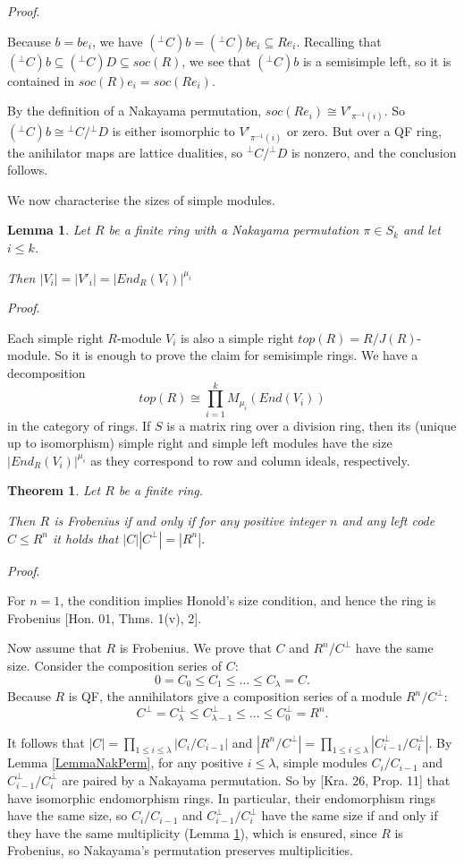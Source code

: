 \documentclass{article}
\theoremstyle{plain}
\newtheorem{Thm}[veta]{Theorem}
\newtheorem{Lemma}[veta]{Lemma}
\theoremstyle{plain}
\theoremstyle{remark}
\theoremstyle{plain}
\newenvironment{dukaz}{
  \par\medskip \noindent
  \textit{Proof}.
}{

\rightline{$\qedsymbol$}
}
\begin{document}
\begin{dukaz}
    Because $b = be_i$, we have $({}^\perp C)b = ({}^\perp C)be_i \subseteq Re_i$.  Recalling that $({}^\perp C)b\subseteq ({}^\perp C)D \subseteq  soc(R)$, we see that $({}^\perp C)b$ is a semisimple left, so it is contained in $soc(R)e_i=soc(Re_i)$. 
    
    
By the definition of a Nakayama permutation, $soc(Re_i)\cong V'_{\pi^{-1}(i)}$. So $({}^\perp C)b\cong {}^\perp C/{}^\perp D$ is either isomorphic to  $V'_{\pi^{-1}(i)}$ or zero. But over a QF ring, the anihilator maps are lattice dualities, so ${}^\perp C/{}^\perp D$ is nonzero, and the conclusion follows.
\end{dukaz}
We now characterise the sizes of simple modules. 
\begin{Lemma}\label{LemmaSize}
    Let $R$ be a finite ring with a Nakayama permutation $\pi\in S_k$ and let $i\leq k$.

    Then $|V_i|=|V'_i|=|End_R(V_i)|^{\mu_i}$
\end{Lemma}
\begin{dukaz}
  Each simple right $R$-module $V_i$ is also a simple right $top(R)=R/J(R)$-module. So it is enough to prove the claim for semisimple rings. We have a decomposition
\[top(R)\cong \prod_{i=1} ^k M_{\mu_i}(End(V_i))\]
in the category of rings. If $S$ is a matrix ring over a division ring, then its (unique up to isomorphism) simple right and simple left modules have the size $|End_R(V_i)|^{\mu_i}$ as they correspond to row and column ideals, respectively.
\end{dukaz}
\begin{Thm}\label{ThmSize}
    Let $R$ be a finite ring.

    Then $R$ is Frobenius if and only if for any positive integer $n$ and any left code $C\leq R^n$ it holds that $|C||C^\perp|=|R^n|$.
\end{Thm}
\begin{dukaz}
  For $n=1$, the condition implies Honold's size condition, and hence the ring is Frobenius [Hon. 01, Thms. 1(v), 2].

  Now assume that $R$ is Frobenius. We prove that $C$ and $R^n/C^\perp$ have the same size. Consider the composition series of $C$:
  \[0=C_0\leq C_1\leq \dots \leq C_\lambda=C.\]
Because $R$ is QF, the annihilators give a composition series of a module $R^n/C^\perp$:
\[C^\perp =C_{\lambda}^\perp \leq C^\perp_{\lambda -1 }\leq \dots \leq C_0^\perp =R^n.\]

It follows that $|C|=\prod_{1\leq i\leq \lambda} |C_i/C_{i-1}|$ and $|R^n/C^\perp|=\prod_{1\leq i\leq \lambda}|C^\perp_{i-1}/C^\perp_{i}|$. By Lemma \ref{LemmaNakPerm}, for any positive $i\leq \lambda$, simple modules $C_i/C_{i-1}$ and $C^\perp_{i-1}/C^\perp_{i}$ are paired by a Nakayama permutation. So by [Kra. 26, Prop. 11] that have isomorphic endomorphism rings. In particular, their endomorphism rings have the same size, so $C_i/C_{i-1}$ and $C^\perp_{i-1}/C^\perp_{i}$ have the same size if and only if they have the same multiplicity (Lemma \ref{LemmaSize}), which is ensured, since $R$ is Frobenius, so Nakayama's permutation preserves multiplicities.
\end{dukaz}
\end{document}
